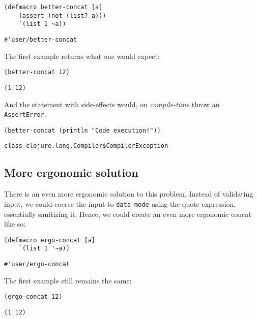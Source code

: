 \documentclass[letterpaper]{article}
\begin{document}
\begin{verbatim}
(defmacro better-concat [a]
    (assert (not (list? a)))
    `(list 1 ~a))
\end{verbatim}

\begin{verbatim}
#'user/better-concat
\end{verbatim}


The first example returns what one would expect:

\begin{verbatim}
(better-concat 12)
\end{verbatim}

\begin{verbatim}
(1 12)
\end{verbatim}


And the statement with side-effects would, on \emph{compile-time} throw an \texttt{AssertError}.

\begin{verbatim}
(better-concat (println "Code execution!"))
\end{verbatim}

\begin{verbatim}
class clojure.lang.Compiler$CompilerException
\end{verbatim}

\subsection{More ergonomic solution}
\label{sec:org452d5cb}
There is an even more ergonomic solution to this problem. Instead of validating input, we could coerce the input to \texttt{data-mode} using the quote-expression, essentially sanitizing it. Hence, we could create an even more ergonomic concat like so:

\begin{verbatim}
(defmacro ergo-concat [a]
    `(list 1 '~a))
\end{verbatim}

\begin{verbatim}
#'user/ergo-concat
\end{verbatim}


The first example still remains the same:

\begin{verbatim}
(ergo-concat 12)
\end{verbatim}

\begin{verbatim}
(1 12)
\end{verbatim}
\end{document}

